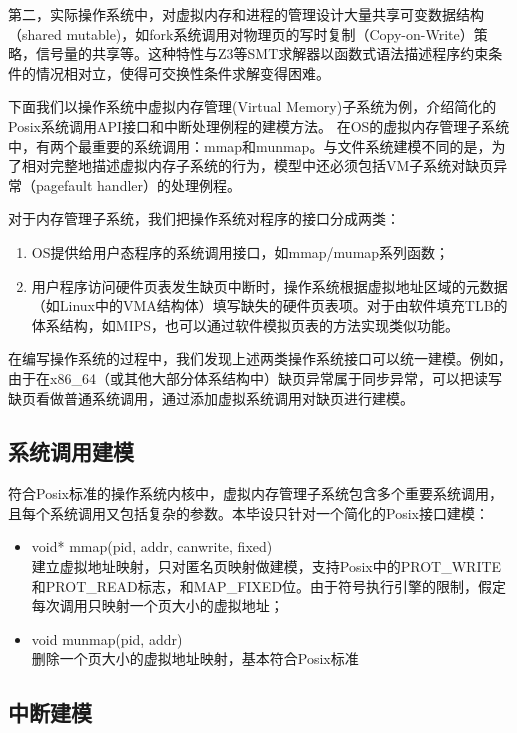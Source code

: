 第二，实际操作系统中，对虚拟内存和进程的管理设计大量共享可变数据结构（shared
mutable)，如fork系统调用对物理页的写时复制（Copy-on-Write）策略，信号量的共享等。这种特性与Z3等SMT求解器以函数式语法描述程序约束条件的情况相对立，使得可交换性条件求解变得困难。

下面我们以操作系统中虚拟内存管理(Virtual Memory)子系统为例，介绍简化的Posix系统调用API接口和中断处理例程的建模方法。
在OS的虚拟内存管理子系统中，有两个最重要的系统调用：mmap和munmap。与文件系统建模不同的是，为了相对完整地描述虚拟内存子系统的行为，模型中还必须包括VM子系统对缺页异常（pagefault
handler）的处理例程。

对于内存管理子系统，我们把操作系统对程序的接口分成两类：
\begin{enumerate}
\item OS提供给用户态程序的系统调用接口，如mmap/mumap系列函数；
\item 用户程序访问硬件页表发生缺页中断时，操作系统根据虚拟地址区域的元数据（如Linux中的VMA结构体）填写缺失的硬件页表项。对于由软件填充TLB的体系结构，如MIPS，也可以通过软件模拟页表的方法实现类似功能。
\end{enumerate}

在编写操作系统的过程中，我们发现上述两类操作系统接口可以统一建模。例如，由于在x86\_64（或其他大部分体系结构中）缺页异常属于同步异常\cite{intelsys}，可以把读写缺页看做普通系统调用，通过添加虚拟系统调用对缺页进行建模。

\subsection{系统调用建模}
符合Posix标准的操作系统内核中，虚拟内存管理子系统包含多个重要系统调用，且每个系统调用又包括复杂的参数。本毕设只针对一个简化的Posix接口建模：

\begin{itemize}
	\item void* mmap(pid, addr, canwrite, fixed) \\
		建立虚拟地址映射，只对匿名页映射做建模，支持Posix中的PROT\_WRITE和PROT\_READ标志，和MAP\_FIXED位。由于符号执行引擎的限制，假定每次调用只映射一个页大小的虚拟地址；
	\item void munmap(pid, addr) \\
		删除一个页大小的虚拟地址映射，基本符合Posix标准
\end{itemize}

\subsection{中断建模}

